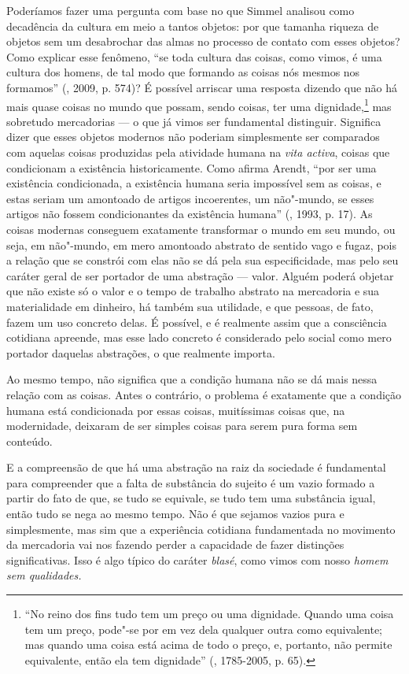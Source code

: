 Poderíamos fazer uma pergunta com base no que Simmel analisou como
decadência da cultura em meio a tantos objetos: por que tamanha riqueza
de objetos sem um desabrochar das almas no processo de contato com esses
objetos? Como explicar esse fenômeno, ``se toda cultura das coisas, como
vimos, é uma cultura dos homens, de tal modo que formando as coisas nós
mesmos nos formamos'' (, 2009, p. 574)? É possível
arriscar uma resposta dizendo que não há mais quase coisas no mundo que
possam, sendo coisas, ter uma dignidade,\footnote{``No reino dos fins
  tudo tem um preço ou uma dignidade. Quando uma coisa tem um preço,
  pode"-se por em vez dela qualquer outra como equivalente; mas quando
  uma coisa está acima de todo o preço, e, portanto, não permite
  equivalente, então ela tem dignidade'' (, 1785-2005, p. 65).}
mas sobretudo mercadorias --- o que já vimos ser fundamental distinguir.
Significa dizer que esses objetos modernos não poderiam simplesmente ser
comparados com aquelas coisas produzidas pela atividade humana na
\emph{vita activa}, coisas que condicionam a existência historicamente.
Como afirma Arendt, ``por ser uma existência condicionada, a existência
humana seria impossível sem as coisas, e estas seriam um amontoado de
artigos incoerentes, um não"-mundo, se esses artigos não fossem
condicionantes da existência humana'' (, 1993, p. 17). As coisas
modernas conseguem exatamente transformar o mundo em seu mundo, ou seja,
em não"-mundo, em mero amontoado abstrato de sentido vago e fugaz, pois a
relação que se constrói com elas não se dá pela sua especificidade, mas
pelo seu caráter geral de ser portador de uma abstração --- valor.
Alguém poderá objetar que não existe só o valor e o tempo de
trabalho abstrato na mercadoria e sua materialidade em dinheiro, há
também sua utilidade, e que pessoas, de fato, fazem um uso concreto
delas. É possível, e é realmente assim que a consciência cotidiana
apreende, mas esse lado concreto é considerado pelo social como mero
portador daquelas abstrações, o que realmente importa.

Ao mesmo tempo, não significa que a condição humana não se dá mais nessa
relação com as coisas. Antes o contrário, o problema é exatamente que a
condição humana está condicionada por essas coisas, muitíssimas coisas
que, na modernidade, deixaram de ser simples coisas para serem pura
forma sem conteúdo.

E a compreensão de que há uma abstração na raiz da sociedade é
fundamental para compreender que a falta de substância do sujeito é um
vazio formado a partir do fato de que, se tudo se equivale, se tudo tem
uma substância igual, então tudo se nega ao mesmo tempo. Não é que
sejamos vazios pura e simplesmente, mas sim que a experiência cotidiana
fundamentada no movimento da mercadoria vai nos fazendo perder a
capacidade de fazer distinções significativas. Isso é algo típico do
caráter \emph{blasé}, como vimos com nosso \emph{homem sem qualidades.}

